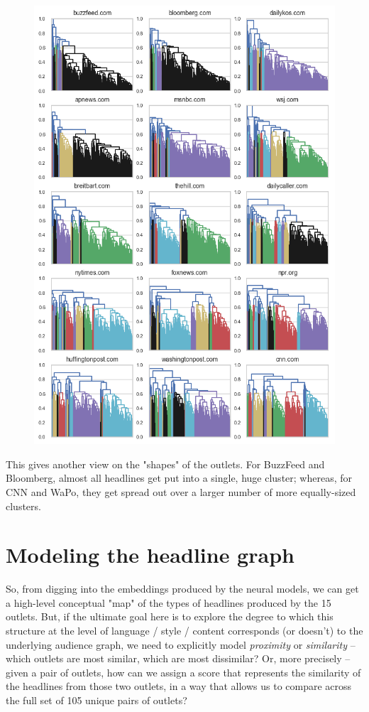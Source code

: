 \documentclass{scrartcl}
\begin{document}
\begin{figure}[H]
  \centering
  \includegraphics[height=0.6\textheight]{figures/cluster-multiples.png}
\end{figure}

This gives another view on the "shapes" of the outlets. For BuzzFeed and Bloomberg, almost all headlines get put into a single, huge cluster; whereas, for CNN and WaPo, they get spread out over a larger number of more equally-sized clusters.


\section{Modeling the headline graph}

So, from digging into the embeddings produced by the neural models, we can get a high-level conceptual "map" of the types of headlines produced by the 15 outlets. But, if the ultimate goal here is to explore the degree to which this structure at the level of language / style / content corresponds (or doesn't) to the underlying audience graph, we need to explicitly model \textit{proximity} or \textit{similarity} -- which outlets are most similar, which are most dissimilar? Or, more precisely -- given a pair of outlets, how can we assign a score that represents the similarity of the headlines from those two outlets, in a way that allows us to compare across the full set of 105 unique pairs of outlets?
\end{document}
